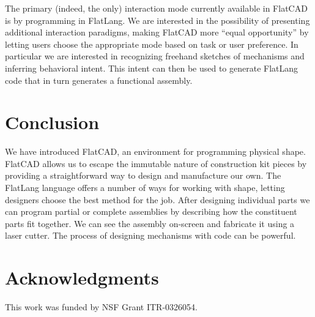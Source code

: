 \documentclass[times, 10pt,twocolumn]{article}
\begin{document}
The primary (indeed, the only) interaction mode currently available in
\nohyphens{FlatCAD} is by programming in \nohyphens{FlatLang}. We are
interested in the possibility of presenting additional interaction
paradigms, making \nohyphens{FlatCAD} more ``equal opportunity''
\cite{cockburn-leogo} by letting users choose the appropriate mode
based on task or user preference. In particular we are interested in
recognizing freehand sketches of mechanisms and inferring behavioral
intent. This intent can then be used to generate \nohyphens{FlatLang}
code that in turn generates a functional assembly.

\section{Conclusion}

We have introduced \nohyphens{FlatCAD}, an environment for programming
physical shape. \nohyphens{FlatCAD} allows us to escape the immutable
nature of construction kit pieces by providing a straightforward way
to design and manufacture our own. The \nohyphens{FlatLang} language
offers a number of ways for working with shape, letting designers
choose the best method for the job. After designing individual parts
we can program partial or complete assemblies by describing how the
constituent parts fit together. We can see the assembly on-screen and
fabricate it using a laser cutter. The process of designing mechanisms
with code can be powerful.

\section{Acknowledgments}

This work was funded by NSF Grant ITR-0326054.



\end{document}
